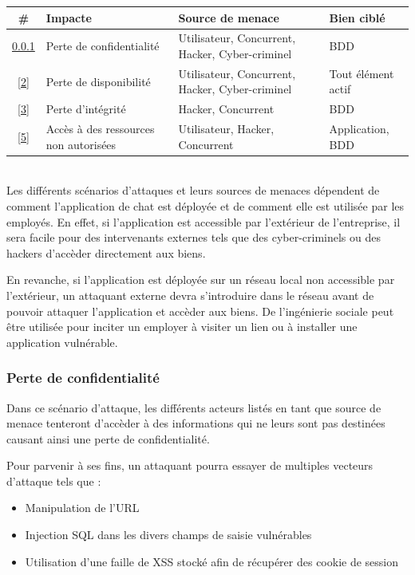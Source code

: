 \documentclass[12pt]{article}
\begin{document}
\begin{tabular}{| c | p{5.5cm} | p{5.5cm} | l |}
  \hline			
  \textbf{\# }& \textbf{Impacte} &\textbf{ Source de menace } & \textbf{Bien ciblé} \\
  \hline  
  \ref{1} & Perte de confidentialité & Utilisateur, Concurrent, Hacker, Cyber-criminel & BDD \\
    \hline  
  \ref{2} & Perte de disponibilité & Utilisateur, Concurrent, Hacker, Cyber-criminel & Tout élément actif \\
    \hline  
  \ref{3} & Perte d'intégrité & Hacker, Concurrent & BDD \\
  \hline  
 \ref{5} & Accès à des ressources non autorisées & Utilisateur, Hacker, Concurrent & Application, BDD \\
  \hline 
\end{tabular}
\\

Les différents scénarios d'attaques et leurs sources de menaces dépendent de comment l'application de chat est déployée et de comment elle est utilisée par les employés. En effet, si l'application est accessible par l'extérieur de l'entreprise, il sera facile pour des intervenants externes tels que des cyber-criminels ou des hackers d'accèder directement aux biens.

En revanche, si l'application est déployée sur un réseau local non accessible par l'extérieur, un attaquant externe devra s'introduire dans le réseau avant de pouvoir attaquer l'application et accèder aux biens. De l'ingénierie sociale peut être utilisée pour inciter un employer à visiter un lien ou à installer une application vulnérable.

\subsubsection{Perte de confidentialité} \label{1}
Dans ce scénario d'attaque, les différents acteurs listés en tant que source de menace tenteront d'accèder à des informations qui ne leurs sont pas destinées causant ainsi une perte de confidentialité. 

Pour parvenir à ses fins, un attaquant pourra essayer de multiples vecteurs d'attaque tels que : 

\begin{itemize}
\item Manipulation de l'URL
\item Injection SQL dans les divers champs de saisie vulnérables
\item Utilisation d'une faille de XSS stocké afin de récupérer des cookie de session
\end{itemize}
\end{document}
